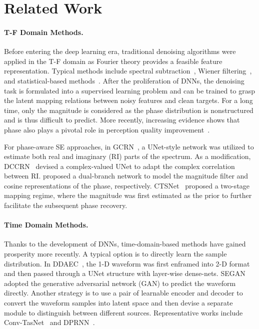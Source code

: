 \documentclass{article}
\begin{document}
\section{Related Work}
\label{sec:related-work}
\paragraph{T-F Domain Methods.}
Before entering the deep learning era, traditional denoising algorithms were applied in the T-F domain as Fourier theory provides a feasible feature representation. Typical methods include spectral subtraction~{\cite{boll1979suppression}}, Wiener filtering~{\cite{scalart1996speech}}, and statistical-based methods~{\cite{ephraim1984speech}}. After the proliferation of DNNs, the denoising task is formulated into a supervised learning problem and can be trained to grasp the latent mapping relations between noisy features and clean targets. For a long time, only the magnitude is considered as the phase distribution is nonstructured and is thus difficult to predict. More recently, increasing evidence shows that phase also plays a pivotal role in perception quality improvement~{\cite{paliwal2011importance}}.

For phase-aware SE approaches, in GCRN~{\cite{tan2020learning}}, a UNet-style network was utilized to estimate both real and imaginary (RI) parts of the spectrum. As a modification, DCCRN~{\cite{hu2020dccrn}} devised a complex-valued UNet to adapt the complex correlation between RI. {\cite{yin2020phasen}} proposed a dual-branch network to model the magnitude filter and cosine representations of the phase, respectively. CTSNet~{\cite{li2021two}} proposed a two-stage mapping regime, where the magnitude was first estimated as the prior to further facilitate the subsequent phase recovery. 
\paragraph{Time Domain Methods.}
Thanks to the development of DNNs, time-domain-based methods have gained prosperity more recently. A typical option is to directly learn the sample distribution. In DDAEC~{\cite{pandey2020densely}}, the 1-D waveform was first enframed into 2-D format and then passed through a UNet structure with layer-wise dense-nets. SEGAN~{\cite{pascual2017segan}} adopted the generative adversarial network (GAN) to predict the waveform directly. Another strategy is to use a pair of learnable encoder and decoder to convert the waveform samples into latent space and then devise a separate module to distinguish between different sources. Representative works include Conv-TasNet~{\cite{luo2019conv}} and DPRNN~{\cite{luo2020dual}}.
\end{document}
